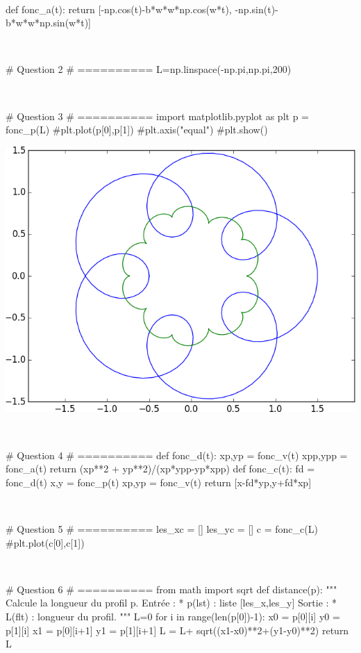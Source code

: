 \documentclass[10pt,fleqn]{article} %
\begin{document}
\begin{corrige}
$\quad$
\begin{python}
def fonc_a(t):
    return [-np.cos(t)-b*w*w*np.cos(w*t),
    		 -np.sin(t)-b*w*w*np.sin(w*t)]
\end{python}
\end{corrige}

\begin{corrige}
$\quad$
\begin{python}
# Question 2
# ==========
L=np.linspace(-np.pi,np.pi,200)
\end{python}
\end{corrige}

\begin{corrige}
$\quad$
\begin{python}
# Question 3
# ==========
import matplotlib.pyplot as plt
p = fonc_p(L)
#plt.plot(p[0],p[1])
#plt.axis("equal")
#plt.show()
\end{python}
\end{corrige}

\begin{center}
\includegraphics[width=.4\linewidth]{programmes/Exercice_12/figure_1}
\end{center}

\begin{corrige}
$\quad$
\begin{python}
# Question 4
# ==========
def fonc_d(t):
    xp,yp = fonc_v(t)
    xpp,ypp = fonc_a(t)
    return (xp**2 + yp**2)/(xp*ypp-yp*xpp)
def fonc_c(t):
    fd = fonc_d(t)
    x,y = fonc_p(t)
    xp,yp = fonc_v(t)
    return [x-fd*yp,y+fd*xp]
\end{python}
\end{corrige}

\begin{corrige}
$\quad$
\begin{python}
# Question 5
# ==========
les_xc  = []
les_yc  = []
c = fonc_c(L)
#plt.plot(c[0],c[1])
\end{python}
\end{corrige}

\begin{corrige}
$\quad$
\begin{python}
# Question 6
# ==========
from math import sqrt
def distance(p):
    """
    Calcule la longueur du profil p.
    Entrée : 
     * p(lst) : liste [les_x,les_y]
    Sortie : 
     * L(flt) : longueur du profil.
    """
    L=0
    for i in range(len(p[0])-1):
        x0 = p[0][i]
        y0 = p[1][i]
        x1 = p[0][i+1]
        y1 = p[1][i+1]
        L = L+ sqrt((x1-x0)**2+(y1-y0)**2)
    return L
\end{python}
\end{corrige}
\end{document}
